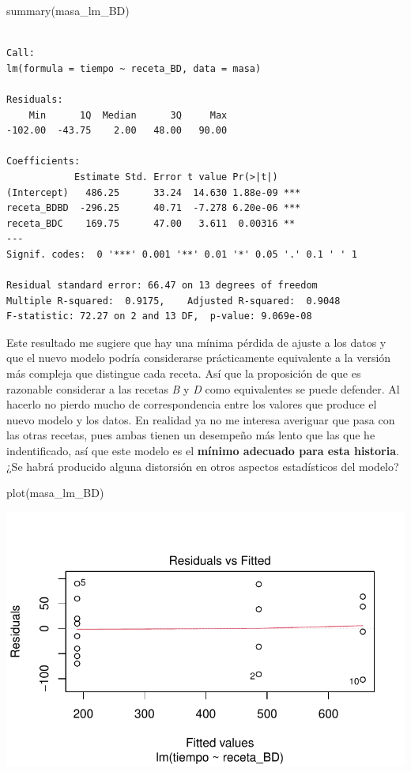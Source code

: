 \documentclass[
  letterpaper,
  DIV=11,
  numbers=noendperiod]{scrartcl}
\newenvironment{Shaded}{\begin{snugshade}}{\end{snugshade}}
\newcommand{\FunctionTok}[1]{\textcolor[rgb]{0.28,0.35,0.67}{#1}}
\newcommand{\NormalTok}[1]{\textcolor[rgb]{0.00,0.23,0.31}{#1}}
\begin{document}
\begin{Shaded}
\begin{Highlighting}[]
\FunctionTok{summary}\NormalTok{(masa\_lm\_BD)}
\end{Highlighting}
\end{Shaded}

\begin{verbatim}

Call:
lm(formula = tiempo ~ receta_BD, data = masa)

Residuals:
    Min      1Q  Median      3Q     Max 
-102.00  -43.75    2.00   48.00   90.00 

Coefficients:
            Estimate Std. Error t value Pr(>|t|)    
(Intercept)   486.25      33.24  14.630 1.88e-09 ***
receta_BDBD  -296.25      40.71  -7.278 6.20e-06 ***
receta_BDC    169.75      47.00   3.611  0.00316 ** 
---
Signif. codes:  0 '***' 0.001 '**' 0.01 '*' 0.05 '.' 0.1 ' ' 1

Residual standard error: 66.47 on 13 degrees of freedom
Multiple R-squared:  0.9175,    Adjusted R-squared:  0.9048 
F-statistic: 72.27 on 2 and 13 DF,  p-value: 9.069e-08
\end{verbatim}

Este resultado me sugiere que hay una mínima pérdida de ajuste a los
datos y que el nuevo modelo podría considerarse prácticamente
equivalente a la versión más compleja que distingue cada receta. Así que
la proposición de que es razonable considerar a las recetas \emph{B} y
\emph{D} como equivalentes se puede defender. Al hacerlo no pierdo mucho
de correspondencia entre los valores que produce el nuevo modelo y los
datos. En realidad ya no me interesa averiguar que pasa con las otras
recetas, pues ambas tienen un desempeño más lento que las que he
indentificado, así que este modelo es el \textbf{mínimo adecuado para
esta historia}. ¿Se habrá producido alguna distorsión en otros aspectos
estadísticos del modelo?

\begin{Shaded}
\begin{Highlighting}[]
\FunctionTok{plot}\NormalTok{(masa\_lm\_BD)}
\end{Highlighting}
\end{Shaded}

\includegraphics{solucion-masa-pizza_files/figure-pdf/graf-combo-recetas-1.pdf}
\end{document}
